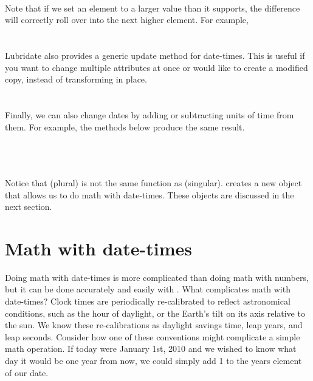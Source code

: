 \documentclass[article]{jss}
\begin{document}
\\

Note that if we set an element to a larger value than it supports, the difference will correctly roll over into the next higher element. For example,\\

\\
\\

Lubridate also provides a generic update method for date-times.  This is useful if you want to change multiple attributes at once or would like to create a modified copy, instead of transforming in place.\\

\\
\\

Finally, we can also change dates by adding or subtracting units of time from them. For example, the methods below produce the same result.\\

\\

\\
\\

Notice that  (plural) is not the same function as  (singular).  creates a new object that allows us to do math with date-times. These objects are discussed in the next section. 

\section{Math with date-times}
\label{sec:types}
Doing math with date-times is more complicated than doing math with numbers, but it can be done accurately and easily with . What complicates math with date-times? Clock times are periodically re-calibrated to reflect astronomical conditions, such as the hour of daylight, or the Earth's tilt on its axis relative to the sun. We know these re-calibrations as daylight savings time, leap years, and leap seconds. Consider how one of these conventions might complicate a simple math operation. If today were January 1st, 2010 and we wished to know what day it would be one year from now, we could simply add 1 to the years element of our date.\\
\end{document}
